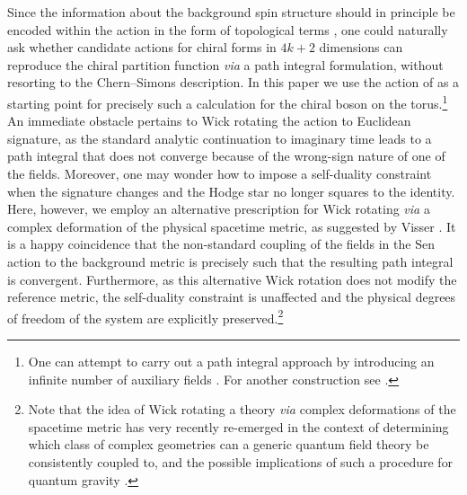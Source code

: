\documentclass[11pt]{article}
\numberwithin{equation}{section}
\begin{document}
Since the information about the background spin structure should in principle be encoded within the action in the form of topological terms \cite{Alvarez-Gaume:1986nqf, Alvarez-Gaume:1987wwg}, one could naturally ask whether candidate actions for chiral forms in $4k+2$ dimensions can reproduce the chiral partition function {\it via} a path integral formulation, without resorting to the Chern--Simons description. In this paper we use the action of \cite{Sen:2015nph,Sen:2019qit} as a starting point for precisely such a calculation for the chiral boson on the torus.\footnote{One can attempt to carry out a path integral approach by introducing an infinite number of auxiliary fields \cite{McClain:1990sx,Devecchi:1996cp}. For another construction see \cite{Chen:2013gca}.} An immediate obstacle pertains to Wick rotating the action to Euclidean signature, as the standard analytic continuation to imaginary time leads to a path integral that does not converge because of the wrong-sign nature of one of the fields. Moreover, one may wonder how to impose a self-duality constraint when the signature changes and the Hodge star no longer squares to the identity. Here, however, we employ an alternative prescription for Wick rotating {\it via} a complex deformation of the physical spacetime metric, as suggested by Visser \cite{Visser:2017atf}. It is a happy coincidence that the non-standard coupling of the fields in the Sen action to the background metric is precisely such that the resulting path integral is convergent. Furthermore, as this alternative Wick rotation does not modify the reference metric, the self-duality constraint is unaffected and the physical degrees of freedom of the system are explicitly preserved.\footnote{Note that the idea of Wick rotating a theory {\it via} complex deformations of the spacetime metric has very recently re-emerged in the context of determining which class of complex geometries can a generic quantum field theory be consistently coupled to, and the possible implications of such a procedure for quantum gravity \cite{Kontsevich:2021dmb,Witten:2021nzp,Visser:2021ucg}.}
\end{document}
